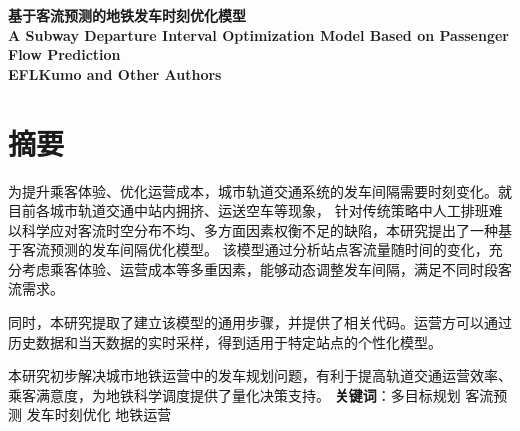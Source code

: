 \thispagestyle{empty}   %

\begin{center}
    \textbf{\fontsize{20}{1.5}基于客流预测的地铁发车时刻优化模型}
    \\
    \textbf{\fontsize{12}{1.5}A Subway Departure Interval Optimization Model Based on Passenger Flow Prediction}
    \\
    \textbf{\fontsize{12}{1.5}EFLKumo and Other Authors}

\end{center}





%
%


\section*{摘要}

为提升乘客体验、优化运营成本，城市轨道交通系统的发车间隔需要时刻变化。就目前各城市轨道交通中站内拥挤、运送空车等现象，
针对传统策略中人工排班难以科学应对客流时空分布不均、多方面因素权衡不足的缺陷，本研究提出了一种基于客流预测的发车间隔优化模型。
该模型通过分析站点客流量随时间的变化，充分考虑乘客体验、运营成本等多重因素，能够动态调整发车间隔，满足不同时段客流需求。

同时，本研究提取了建立该模型的通用步骤，并提供了相关代码。运营方可以通过历史数据和当天数据的实时采样，得到适用于特定站点的个性化模型。

本研究初步解决城市地铁运营中的发车规划问题，有利于提高轨道交通运营效率、乘客满意度，为地铁科学调度提供了量化决策支持。\newline
\newline
\textbf{关键词}：多目标规划 \quad 客流预测 \quad 发车时刻优化 \quad 地铁运营
